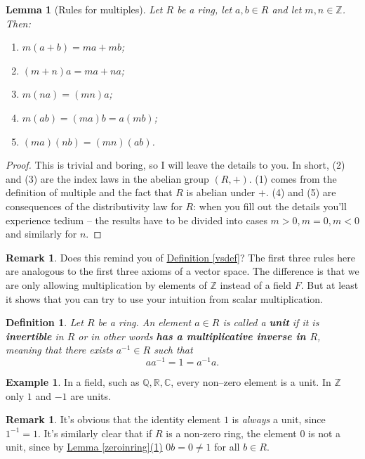 \documentclass[11pt]{amsbook}
\newtheorem{definition}[theorem]{Definition}
\newtheorem{lemma}[theorem]{Lemma}
\theoremstyle{definition}
\newtheorem{rem}[theorem]{Remark}
\newtheorem{ex}[theorem]{Example}
\begin{document}
\begin{lemma}[Rules for multiples] \label{ruleformult} Let $R$ be a ring, let $a,b\in R$ and let $m,n\in \mathbb{Z}$. Then:
\begin{enumerate}
\item $m(a+b) = ma + mb$;
\item $(m+n) a = ma + na$;
\item $m(na) = (mn)a$;
\item $m (ab) = (ma)b = a(mb)$;
\item $(ma)(nb) = (mn)(ab)$.
\end{enumerate}
\end{lemma}
\begin{proof} This is trivial and boring, so I will leave the details to you. In short, (2) and (3) are the index laws in the abelian group $(R, +)$. (1) comes from the definition of multiple and the
fact that $R$ is abelian under $+$. (4) and (5) are consequences of the
distributivity law for $R$: when you fill out the details you'll experience tedium -- the
results have to be divided into cases $m>0, m=0, m<0$ and
similarly for $n$.
\end{proof}
\begin{rem} Does this remind you of \hyperref[vsdef]{Definition \ref{vsdef}}? The first three rules here are analogous to the first three axioms of a vector space. The difference is that we are only allowing multiplication by elements of $\mathbb{Z}$ instead of a field $F$. But at least it shows that you can try to use your intuition from scalar multiplication. \end{rem}

\begin{definition} Let $R$ be a ring. An element $a\in R$ is called a \textbf{unit} if it is \textbf{invertible} in $R$ or in other words {\bf has a multiplicative inverse in $R$}, meaning that there exists $a^{-1}\in R$ such that $$aa^{-1} = 1 = a^{-1}a.$$
\end{definition}

\begin{ex}
In a field, such as $\mathbb{Q}, \mathbb{R}, \mathbb{C}$, every non--zero element is a unit. In $\mathbb{Z}$ only $1$ and $-1$ are units.
\end{ex}

\begin{rem} It's obvious that the identity element $1$ is \textit{always} a unit, since $1^{-1} = 1$. It's similarly clear that if $R$ is a non-zero ring, the element $0$ is not a unit, since by \hyperref[zeroinring]{Lemma \ref{zeroinring}(1)} $0 b = 0 \neq 1$ for all $b\in R$.
\end{rem}
\end{document}
